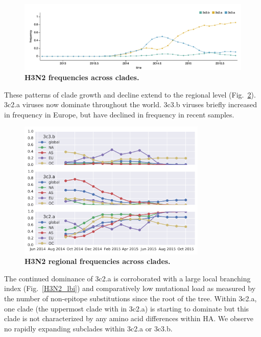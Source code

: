 \documentclass[11pt,oneside,letterpaper]{article}
\begin{document}
\begin{figure}[h!]
	\centering		
	\includegraphics[width=1.0\textwidth]{../figures/sep-2015/H3N2_frequencies.png}
	\caption{\textbf{H3N2 frequencies across clades.} 
	}
	\label{H3N2_frequencies}
\end{figure}

These patterns of clade growth and decline extend to the regional level (Fig.~\ref{H3N2_HA1-159_frequencies}). 3c2.a viruses now dominate throughout the world. 3c3.b viruses briefly increased in frequency in Europe, but have declined in frequency in recent samples.

\begin{figure}[h!]
	\centering		
	\includegraphics[width=0.8\textwidth]{../figures/sep-2015/H3N2_HA1-159_frequencies.png}
	\caption{\textbf{H3N2 regional frequencies across clades.} 
	}
	\label{H3N2_HA1-159_frequencies}
\end{figure}

The continued dominance of 3c2.a is corroborated with a large local branching index (Fig.~\ref{H3N2_lbi}) and comparatively low mutational load as measured by the number of non-epitope substitutions since the root of the tree. Within 3c2.a, one clade (the uppermost clade with in 3c2.a) is starting to dominate but this clade is not characterized by any amino acid differences within HA. We observe no rapidly expanding subclades within 3c2.a or 3c3.b.
\end{document}
